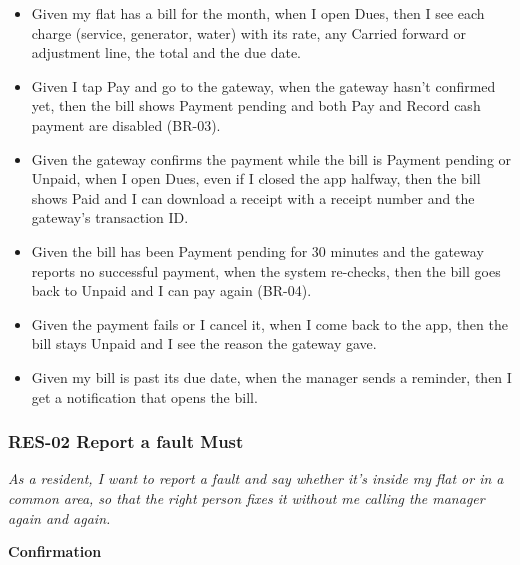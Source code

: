\documentclass[11pt,a4paper]{report}
\begin{document}
\begin{itemize}
  \item Given my flat has a bill for the month, when I open Dues, then I see each charge (service, generator, water) with its rate, any Carried forward or adjustment line, the total and the due date.
  \item Given I tap Pay and go to the gateway, when the gateway hasn't confirmed yet, then the bill shows Payment pending and both Pay and Record cash payment are disabled (BR-03).
  \item Given the gateway confirms the payment while the bill is Payment pending or Unpaid, when I open Dues, even if I closed the app halfway, then the bill shows Paid and I can download a receipt with a receipt number and the gateway's transaction ID.
  \item Given the bill has been Payment pending for 30 minutes and the gateway reports no successful payment, when the system re-checks, then the bill goes back to Unpaid and I can pay again (BR-04).
  \item Given the payment fails or I cancel it, when I come back to the app, then the bill stays Unpaid and I see the reason the gateway gave.
  \item Given my bill is past its due date, when the manager sends a reminder, then I get a notification that opens the bill.
\end{itemize}

\subsubsection*{RES-02 \textperiodcentered{} Report a fault \textperiodcentered{} Must}

\emph{As a resident, I want to report a fault and say whether it's inside my flat or in a common area, so that the right person fixes it without me calling the manager again and again.}

\medskip\noindent\textbf{Confirmation}\par
\end{document}
